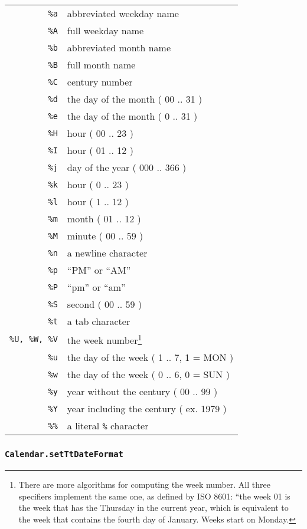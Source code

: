 \documentclass[a4paper,10pt]{article}
\begin{document}
\begin{tabular}{ r l }
\\
\texttt{\%a} & abbreviated weekday name \\
\texttt{\%A} & full weekday name \\
\texttt{\%b} & abbreviated month name \\
\texttt{\%B} & full month name \\
\texttt{\%C} & century number \\
\texttt{\%d} & the day of the month ( 00 .. 31 ) \\
\texttt{\%e} & the day of the month ( 0 .. 31 ) \\
\texttt{\%H} & hour ( 00 .. 23 ) \\
\texttt{\%I} & hour ( 01 .. 12 ) \\
\texttt{\%j} & day of the year ( 000 .. 366 ) \\
\texttt{\%k} & hour ( 0 .. 23 ) \\
\texttt{\%l} & hour ( 1 .. 12 ) \\
\texttt{\%m} & month ( 01 .. 12 ) \\
\texttt{\%M} & minute ( 00 .. 59 ) \\
\texttt{\%n} & a newline character \\
\texttt{\%p} & ``PM'' or ``AM'' \\
\texttt{\%P} & ``pm'' or ``am'' \\
\texttt{\%S} & second ( 00 .. 59 ) \\
\texttt{\%t} & a tab character \\
\texttt{\%U, \%W, \%V} & the week number\footnote{There are more algorithms for
computing the week number.  All three specifiers implement the same one, as
defined by ISO 8601: ``the week 01 is the week that has the Thursday in the
current year, which is equivalent to the week that contains the fourth day of
January.  Weeks start on Monday.}\\
\texttt{\%u} & the day of the week ( 1 .. 7, 1 = MON )\\
\texttt{\%w} & the day of the week ( 0 .. 6, 0 = SUN )\\
\texttt{\%y} & year without the century ( 00 .. 99 )\\
\texttt{\%Y} & year including the century ( ex. 1979 )\\
\texttt{\%\%} & a literal \texttt{\%} character
\end{tabular}

\subsubsection{\texttt{Calendar.setTtDateFormat}}\label{sec:Calendar.setTtDateFormat}
\end{document}
